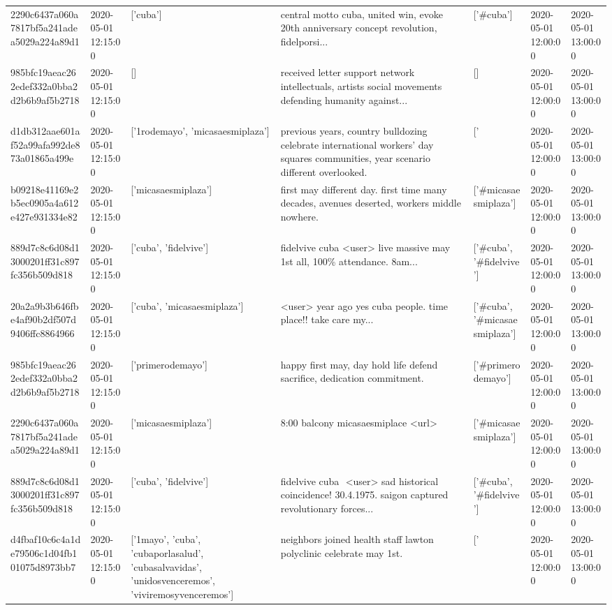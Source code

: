 \begin{tabular}{lllllll}
2290c6437a060a7817bf5a241adea5029a224a89d1 & 2020-05-01 12:15:00 & ['cuba'] & central motto cuba, united win, evoke 20th anniversary concept revolution, fidelporsi... & ['#cuba'] & 2020-05-01 12:00:00 & 2020-05-01 13:00:00 \\
985bfc19aeac262edef332a0bba2d2b6b9af5b2718 & 2020-05-01 12:15:00 & [] & received letter support network intellectuals, artists social movements defending humanity against... & [] & 2020-05-01 12:00:00 & 2020-05-01 13:00:00 \\
d1db312aae601af52a99afa992de873a01865a499e & 2020-05-01 12:15:00 & ['1rodemayo', 'micasaesmiplaza'] & previous years, country bulldozing celebrate international workers' day squares communities, year scenario different overlooked. & ['#1rodemayo', '#micasaesmiplaza'] & 2020-05-01 12:00:00 & 2020-05-01 13:00:00 \\
b09218e41169e2b5ec0905a4a612e427e931334e82 & 2020-05-01 12:15:00 & ['micasaesmiplaza'] & first may different day. first time many decades, avenues deserted, workers middle nowhere. & ['#micasaesmiplaza'] & 2020-05-01 12:00:00 & 2020-05-01 13:00:00 \\
889d7c8c6d08d13000201ff31c897fc356b509d818 & 2020-05-01 12:15:00 & ['cuba', 'fidelvive'] & fidelvive cuba️ <user> live massive may 1st all, 100\% attendance. 8am... & ['#cuba', '#fidelvive'] & 2020-05-01 12:00:00 & 2020-05-01 13:00:00 \\
20a2a9b3b646fbe4af90b2df507d9406ffc8864966 & 2020-05-01 12:15:00 & ['cuba', 'micasaesmiplaza'] & <user> year ago yes cuba people. time place!! take care my... & ['#cuba', '#micasaesmiplaza'] & 2020-05-01 12:00:00 & 2020-05-01 13:00:00 \\
985bfc19aeac262edef332a0bba2d2b6b9af5b2718 & 2020-05-01 12:15:00 & ['primerodemayo'] & happy first may, day hold life defend sacrifice, dedication commitment. & ['#primerodemayo'] & 2020-05-01 12:00:00 & 2020-05-01 13:00:00 \\
2290c6437a060a7817bf5a241adea5029a224a89d1 & 2020-05-01 12:15:00 & ['micasaesmiplaza'] & 8:00 balcony micasaesmiplace <url> & ['#micasaesmiplaza'] & 2020-05-01 12:00:00 & 2020-05-01 13:00:00 \\
889d7c8c6d08d13000201ff31c897fc356b509d818 & 2020-05-01 12:15:00 & ['cuba', 'fidelvive'] & fidelvive cuba ️ <user> sad historical coincidence! 30.4.1975. saigon captured revolutionary forces... & ['#cuba', '#fidelvive'] & 2020-05-01 12:00:00 & 2020-05-01 13:00:00 \\
d4fbaf10c6c4a1de79506c1d04fb101075d8973bb7 & 2020-05-01 12:15:00 & ['1mayo', 'cuba', 'cubaporlasalud', 'cubasalvavidas', 'unidosvenceremos', 'viviremosyvenceremos'] & neighbors joined health staff lawton polyclinic celebrate may 1st. & ['#1mayo', '#cuba', '#cubaporlasalud', '#cubasalvavidas', '#unidosvenceremos', '#viviremosyvenceremos'] & 2020-05-01 12:00:00 & 2020-05-01 13:00:00 \\

\end{tabular}
